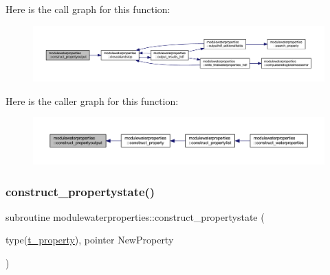 Here is the call graph for this function\+:\nopagebreak
\begin{figure}[H]
\begin{center}
\leavevmode
\includegraphics[width=350pt]{namespacemodulewaterproperties_a37e8798b8bd2e4c33eff80dd151d0d31_cgraph}
\end{center}
\end{figure}
Here is the caller graph for this function\+:\nopagebreak
\begin{figure}[H]
\begin{center}
\leavevmode
\includegraphics[width=350pt]{namespacemodulewaterproperties_a37e8798b8bd2e4c33eff80dd151d0d31_icgraph}
\end{center}
\end{figure}
\mbox{\label{namespacemodulewaterproperties_ae8c62a5189e434530eafcfe1fe66dae4}} 
\subsubsection{\texorpdfstring{construct\+\_\+propertystate()}{construct\_propertystate()}}
{\footnotesize\ttfamily subroutine modulewaterproperties\+::construct\+\_\+propertystate (\begin{DoxyParamCaption}\item[{type(\mbox{\hyperlink{structmodulewaterproperties_1_1t__property}{t\+\_\+property}}), pointer}]{New\+Property }\end{DoxyParamCaption})\hspace{0.3cm}{\ttfamily [private]}}


